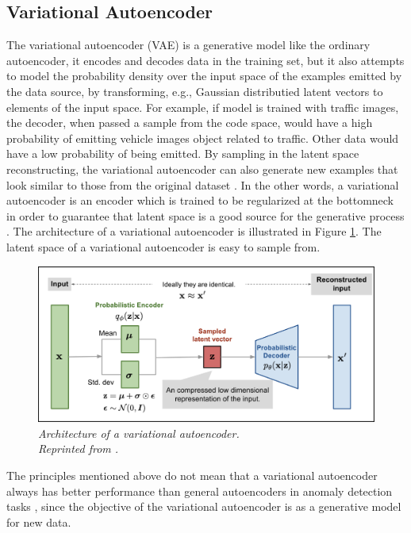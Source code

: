 \subsection{Variational Autoencoder}

The variational autoencoder (VAE) is a generative model like the ordinary autoencoder, it encodes and decodes data in the training set, but it also attempts to model the probability density over the input space of the examples emitted by the data source, by transforming, e.g., Gaussian distributied latent vectors to elements of the input space. For example, if model is trained with traffic images, the decoder, when passed a sample from the code space, would have a high probability of emitting vehicle images object related to traffic. Other data would have a low probability of being emitted. By sampling in the latent space reconstructing, the variational autoencoder can also generate new examples that look similar to those from the original dataset \cite{roger_2021}. In the other words, a variational autoencoder is an encoder which is trained to be regularized at the bottomneck in order to guarantee that latent space is a good source for the generative process \cite{rocca_2020}. The architecture of a variational autoencoder is illustrated in Figure \ref{fig:VAE}. The latent space of a variational autoencoder is easy to sample from.

\begin{figure}[H]
  \centering
  \caption[Architecture of a variational autoencoder.]{\emph{Architecture of a variational autoencoder. \\
      Reprinted from \citeauthor{weng_2018} \citeyear{weng_2018}.}}\label{fig:VAE}
  \includegraphics[scale = 0.15]{figures/VAE.jpg}
\end{figure}


The principles mentioned above do not mean that a variational autoencoder always has better performance than general autoencoders in anomaly detection tasks \cite{agmon_2021}, since the objective of the variational autoencoder is as a generative model for new data.

